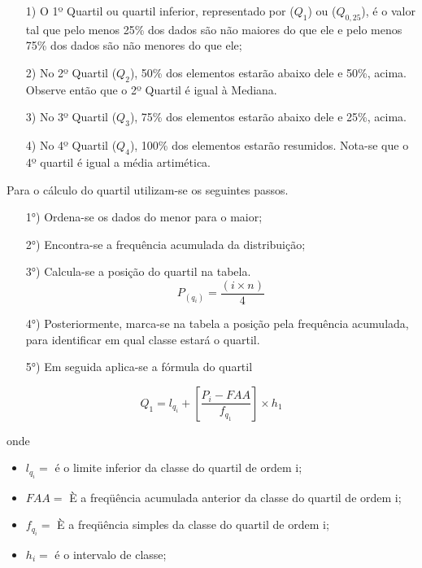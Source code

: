 \begin{enumerate}
  \item[{1)}] O 1º Quartil ou quartil inferior, representado por ($Q_{1}$) ou ($Q_{0,25}$), é o valor tal que pelo menos 25\% dos dados são não maiores do que ele e pelo menos 75\% dos dados são não menores do que ele;


  
  \item[{2)}] No 2º Quartil ($Q_{2}$), 50\% dos elementos estarão abaixo dele e 50\%, acima. Observe então que o 2º Quartil é igual à Mediana.
  \item[{3)}] No 3º Quartil ($Q_{3}$), 75\% dos elementos estarão abaixo dele e 25\%, acima.
  \vskip0.3cm
 \item[{4)}] No 4º Quartil ($Q_{4}$), 100\% dos elementos estarão resumidos. Nota-se que o 4º quartil é igual a média artimética.
\end{enumerate}


Para o cálculo do quartil utilizam-se os seguintes passos.



\begin{enumerate}

\item [{1°)}] Ordena-se os dados do menor para o maior;
\item [{2°)}] Encontra-se a frequência acumulada da distribuição;
\item [{3°)}]Calcula-se a posição do quartil na tabela.
$$ P_{(q_{i})}=\frac{(i \times n)}{4}$$
\item [{4°)}] Posteriormente, marca-se na tabela a posição pela frequência acumulada, para identificar em qual classe estará o quartil.
\item [{5°)}] Em seguida aplica-se a fórmula do quartil
\end{enumerate}

\begin{equation}\label{}
    Q_{1}= l_{q_{i}}+\left[\frac{P_{i}-FAA}{f_{q_{1}}}\right]\times h_{1}
\end{equation}

 onde

 \begin{itemize}
   \item $l_{q_{i}}=$ é o limite inferior da classe do quartil de ordem i;
   \item $FAA=$ È a freqüência acumulada anterior da classe do quartil de ordem i;
   \item $f_{q_{i}}=$ È a freqüência simples da classe do quartil de ordem i;
   \item $h_{i}=$ é o intervalo de classe;
 \end{itemize}




